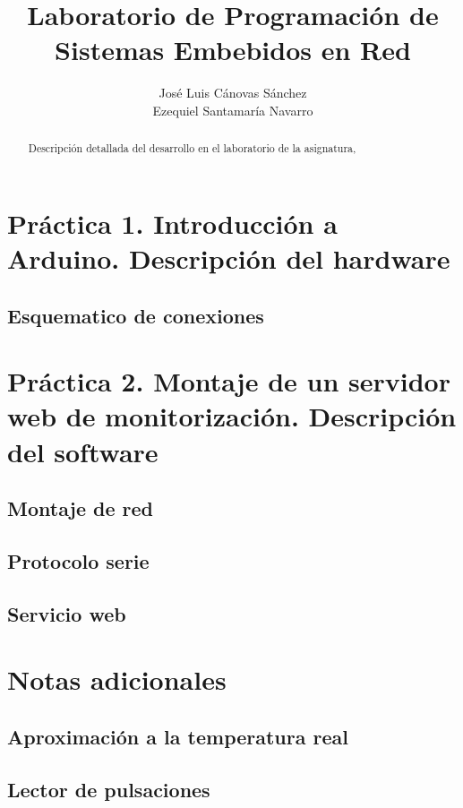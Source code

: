 \documentclass[]{article}
\title{Laboratorio de Programación de Sistemas Embebidos en Red}
\author{José Luis Cánovas Sánchez\\Ezequiel Santamaría Navarro}
\begin{document}
\maketitle


\begin{abstract}
Descripción detallada del desarrollo en el laboratorio de la asignatura, 
\end{abstract}

\tableofcontents

\clearpage

\section{Práctica 1. Introducción a Arduino. Descripción del hardware}

\subsection{Esquematico de conexiones}




\section{Práctica 2. Montaje de un servidor web de monitorización. Descripción del software}

\subsection{Montaje de red}

\subsection{Protocolo serie}

\subsection{Servicio web}


\section{Notas adicionales}

\subsection{Aproximación a la temperatura real}

\subsection{Lector de pulsaciones}
\end{document}
